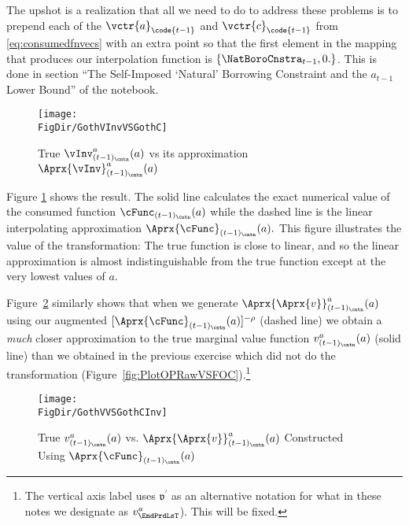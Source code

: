 The upshot is a realization that all we need to do to address these problems is to prepend each of the $\vctr{a}_{\code{t-1}}$ and $\vctr{c}_{\code{t-1}}$ from \eqref{eq:consumedfnvecs} with an extra point so that the first element in the mapping that produces our interpolation function is $\{\NatBoroCnstra_{t-1},0.\}$. This is done in section ``The Self-Imposed `Natural' Borrowing Constraint and the $a_{t-1}$ Lower Bound'' of the notebook.%


\hypertarget{GothVInvVSGothC}{}
\begin{figure}
  \centerline{\texttt{[image: \\FigDir/GothVInvVSGothC]}}
  \caption{True $\vInv^{a}_{(t-1)_\cntn}(a)$ vs its approximation $\Aprx{\vInv}^{a}_{(t-1)_\cntn}(a)$}
  \label{fig:GothVInvVSGothC}
\end{figure}

Figure \ref{fig:GothVInvVSGothC} shows the result. The solid line calculates the exact numerical value of the consumed function $\cFunc_{(t-1)_\cntn}(a)$ while the dashed line is the linear interpolating approximation $\Aprx{\cFunc}_{(t-1)_\cntn}(a).$ This figure illustrates the value of the transformation: The true function is close to linear, and so the linear approximation is almost indistinguishable from the true function except at the very lowest values of $a$.

Figure~\ref{fig:GothVVSGothCInv} similarly shows that when we generate $\Aprx{\Aprx{v}}_{(t-1)_\cntn}^{a}(a)$ using our augmented $[\Aprx{\cFunc}_{(t-1)_\cntn}(a)]^{-\rho}$ (dashed line) we obtain a \textit{much} closer approximation to the true marginal value function $v^{a}_{(t-1)_\cntn}(a)$ (solid line) than we obtained in the previous exercise which did not do the transformation (Figure~\ref{fig:PlotOPRawVSFOC}).\footnote{The vertical axis label uses $\mathfrak{v}^{\prime}$ as an alternative notation for what in these notes we designate as $v^{a}_{\EndPrdLsT}$).  This will be fixed.}

\hypertarget{GothVVSGothCInv}{}
\begin{figure}
  \centerline{\texttt{[image: \\FigDir/GothVVSGothCInv]}}
  \caption{True $v^{a}_{(t-1)_\cntn}(a)$ vs. $\Aprx{\Aprx{v}}_{(t-1)_\cntn}^{a}(a)$ Constructed Using $\Aprx{\cFunc}_{(t-1)_\cntn}(a)$}
  \label{fig:GothVVSGothCInv}
\end{figure}

